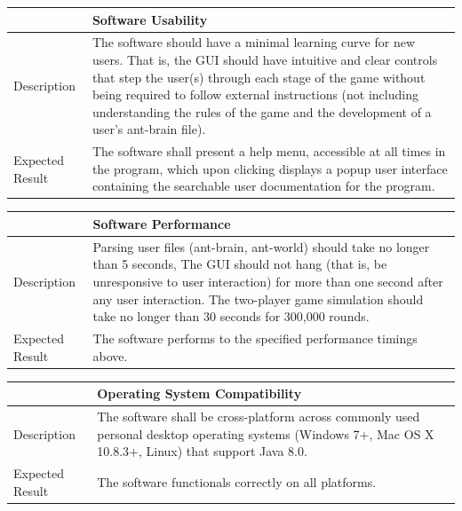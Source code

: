 \documentclass[11pt]{article}
\begin{document}
\begin{longtable}[c]{@{}p{}p{}@{}}
\toprule
& Software Usability \tabularnewline
\midrule
Description & The software should have a minimal learning curve for
new users. That is, the GUI should have intuitive and clear controls
that step the user(s) through each stage of the game without being
required to follow external instructions (not including understanding
the rules of the game and the development of a user's ant-brain file). \tabularnewline
Expected Result & The software shall present a help menu, accessible at
all times in the program, which upon clicking displays a popup user
interface containing the searchable user documentation for the program. \tabularnewline
\bottomrule
\end{longtable}

\begin{longtable}[c]{@{}p{}p{}@{}}
\toprule
& Software Performance \tabularnewline
\midrule
Description & Parsing user files (ant-brain, ant-world) should take
no longer than 5 seconds, The GUI should not hang (that is, be
unresponsive to user interaction) for more than one second after any
user interaction. The two-player game simulation should take no longer
than 30 seconds for 300,000 rounds. \tabularnewline
Expected Result & The software performs to the specified performance
timings above. \tabularnewline
\bottomrule
\end{longtable}

\begin{longtable}[c]{@{}p{}p{}@{}}
\toprule
& Operating System Compatibility \tabularnewline
\midrule
Description & The software shall be cross-platform across commonly
used personal desktop operating systems (Windows 7+, Mac OS X 10.8.3+,
Linux) that support Java 8.0. \tabularnewline
Expected Result & The software functionals correctly on all platforms.\tabularnewline
\bottomrule
\end{longtable}
\end{document}
